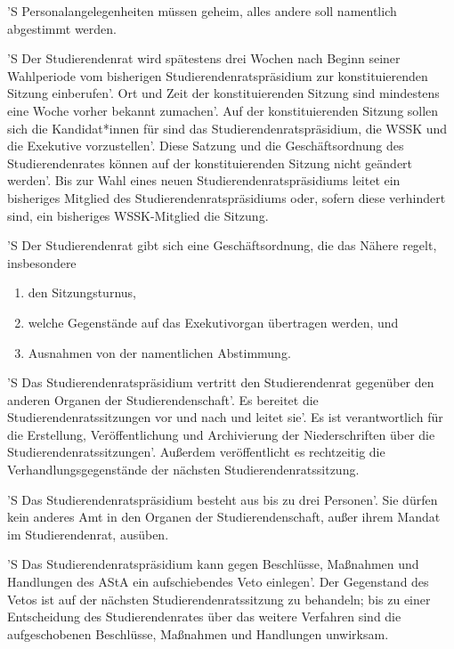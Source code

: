 \documentclass[fontsize=12pt,parskip=half]{scrartcl}
\begin{document}
\begin{contract}
  'S Personalangelegenheiten müssen geheim, alles andere soll namentlich abgestimmt
  werden.

  'S Der Studierendenrat wird spätestens drei Wochen nach Beginn seiner Wahlperiode
  vom bisherigen Studierendenratspräsidium zur konstituierenden Sitzung
  einberufen'. Ort und Zeit der konstituierenden Sitzung sind mindestens eine
  Woche vorher bekannt zumachen'. Auf der konstituierenden Sitzung sollen sich
  die Kandidat*innen für sind das Studierendenratspräsidium, die WSSK und die
  Exekutive vorzustellen'. Diese Satzung und die Geschäftsordnung des
  Studierendenrates können auf der konstituierenden Sitzung nicht geändert
  werden'. Bis zur Wahl eines neuen Studierendenratspräsidiums leitet ein
  bisheriges Mitglied des Studierendenratspräsidiums oder,  sofern diese
  verhindert sind, ein bisheriges WSSK-Mitglied die Sitzung.



  'S Der Studierendenrat gibt sich eine Geschäftsordnung, die das Nähere regelt,
  insbesondere
  \begin{enumerate}[\qquad 1.]
  \item den Sitzungsturnus,
  \item welche Gegenstände auf das Exekutivorgan übertragen werden, und
  \item Ausnahmen von der namentlichen Abstimmung.
  \end{enumerate}



  'S Das Studierendenratspräsidium vertritt den Studierendenrat gegenüber den
  anderen Organen der Studierendenschaft'. Es bereitet die
  Studierendenratssitzungen vor und nach und leitet sie'. Es ist verantwortlich
  für die Erstellung, Veröffentlichung und Archivierung der Niederschriften über
  die Studierendenratssitzungen'. Außerdem veröffentlicht es rechtzeitig die
  Verhandlungsgegenstände der nächsten Studierendenratssitzung.

  'S Das Studierendenratspräsidium besteht aus bis zu drei Personen'. Sie dürfen
  kein anderes Amt in den Organen der Studierendenschaft, außer ihrem Mandat im
  Studierendenrat, ausüben.

  'S Das Studierendenratspräsidium kann gegen Beschlüsse, Maßnahmen und Handlungen
  des AStA ein aufschiebendes Veto einlegen'. Der Gegenstand des Vetos ist auf
  der nächsten Studierendenratssitzung zu behandeln; bis zu einer Entscheidung
  des Studierendenrates über das weitere Verfahren sind die aufgeschobenen
  Beschlüsse, Maßnahmen und Handlungen unwirksam.


\end{contract}
\end{document}
